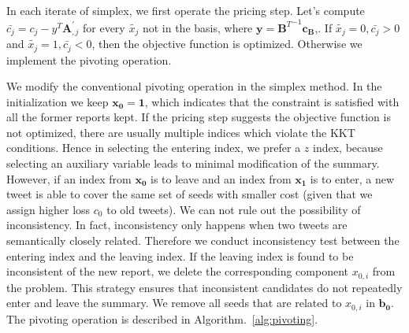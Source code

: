 \documentclass[envcountsame]{llncs}
\begin{document}
In each iterate of simplex, we first operate the pricing step.  Let's compute $\bar{c_j} = c_j - y^T\mathbf{A}_{,j}^{'}$ for every $\tilde{x_j}$ not in the basis, where $\mathbf{y} = {\mathbf{B}^T}^{-1}\mathbf{c_B}$,. If $\tilde{x_j }= 0, \bar{c_j} > 0$ and $\tilde{x_j} = 1,\bar{c_j} < 0$, then the objective function is optimized. Otherwise we implement the pivoting operation.


We modify the conventional pivoting operation in the simplex method. In the initialization we keep $\mathbf{x_0}=\mathbf{1}$, which indicates that the constraint is satisfied with all the former reports kept. If the pricing step suggests the objective function is not optimized, there are usually multiple indices which violate the KKT conditions.  Hence in selecting the entering index, we prefer a $z$ index, because selecting an auxiliary variable leads to minimal modification of the summary. However, if an index from $\mathbf{x_0}$ is to leave and an index from $\mathbf{x_1}$ is to enter, a new tweet is able to cover the same set of seeds with smaller cost (given that we assign higher loss $c_0$ to old tweets). We can not rule out the possibility of inconsistency. In fact, inconsistency only happens when two tweets are semantically closely related. Therefore we conduct inconsistency test between the entering index and the leaving index. If the leaving index is found to be inconsistent of the new report, we delete the corresponding component $x_{0,i}$ from the problem. This strategy ensures that inconsistent candidates do not repeatedly enter and leave the summary. We remove all seeds that are related to $x_{0,i}$ in $\mathbf{b_0}$. The pivoting operation is described in Algorithm.~\ref{alg:pivoting}.

%
\end{document}
